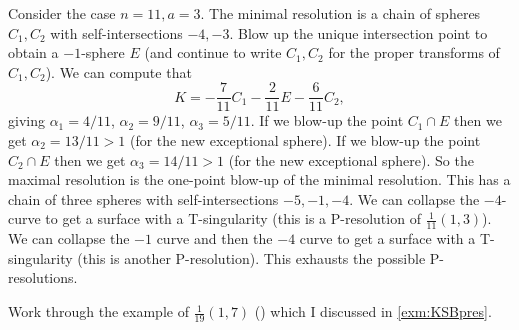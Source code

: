 \documentclass{article}
\begin{document}
\begin{Example}
Consider the case \(n=11,a=3\). The minimal resolution is a chain of
spheres \(C_1,C_2\) with self-intersections \(-4,-3\). Blow up the
unique intersection point to obtain a \(-1\)-sphere \(E\) (and
continue to write \(C_1,C_2\) for the proper transforms of
\(C_1,C_2\)). We can compute that
\[K=-\frac{7}{11}C_1-\frac{2}{11}E-\frac{6}{11}C_2,\] giving
\(\alpha_1=4/11\), \(\alpha_2=9/11\), \(\alpha_3=5/11\). If we
blow-up the point \(C_1\cap E\) then we get \(\alpha_2=13/11>1\)
(for the new exceptional sphere). If we blow-up the point \(C_2\cap
E\) then we get \(\alpha_3=14/11>1\) (for the new exceptional
sphere). So the maximal resolution is the one-point blow-up of the
minimal resolution. This has a chain of three spheres with
self-intersections \(-5,-1,-4\). We can collapse the \(-4\)-curve to
get a surface with a T-singularity (this is a P-resolution of
\(\frac{1}{11}(1,3)\)). We can collapse the \(-1\) curve and then
the \(-4\) curve to get a surface with a T-singularity (this is
another P-resolution). This exhausts the possible P-resolutions.


\end{Example}
\begin{Exercise}
Work through the example of \(\frac{1}{19}(1,7)\) ({\cite[Example
3.15]{KSB}}) which I discussed in \cref{exm:KSBpres}.


\end{Exercise}


\end{document}
